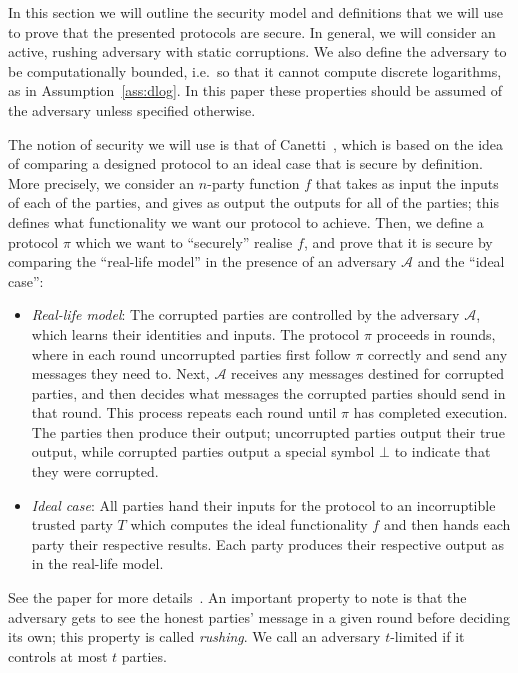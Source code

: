 \documentclass{article}
\newcommand\paper{paper}
\theoremstyle{remark}
\begin{document}
\newcommand{\ideal}[4]{\textup{\texttt{IDEAL}}_{#1, #2} (#3, #4)}
\newcommand{\idealD}{\ideal{\proto}{\mathcal{S}}{x}{z}}

In this section we will outline the security model and definitions that we will
use to prove that the presented protocols are secure. In general, we will
consider an active, rushing adversary with static corruptions. We also define
the adversary to be computationally bounded, i.e.\ so that it cannot compute
discrete logarithms, as in Assumption~\ref{ass:dlog}. In this \paper{} these
properties should be assumed of the adversary unless specified otherwise.

The notion of security we will use is that of Canetti~\cite{c00}, which is
based on the idea of comparing a designed protocol to an ideal case that is
secure by definition. More precisely, we consider an $n$-party function $f$
that takes as input the inputs of each of the parties, and gives as output the
outputs for all of the parties; this defines what functionality we want our
protocol to achieve. Then, we define a protocol $\pi$ which we want to
``securely'' realise $f$, and prove that it is secure by comparing the
``real-life model'' in the presence of an adversary $\mathcal{A}$ and the
``ideal case'':
\begin{itemize}
	\item \textit{Real-life model}: The corrupted parties are controlled by the
		adversary $\mathcal{A}$, which learns their identities and inputs. The
		protocol $\pi$ proceeds in rounds, where in each round uncorrupted
		parties first follow $\pi$ correctly and send any messages they need
		to. Next, $\mathcal{A}$ receives any messages destined for corrupted
		parties, and then decides what messages the corrupted parties should
		send in that round. This process repeats each round until $\pi$ has
		completed execution. The parties then produce their output; uncorrupted
		parties output their true output, while corrupted parties output a
		special symbol $\bot$ to indicate that they were corrupted.

	\item \textit{Ideal case}: All parties hand their inputs for the protocol
		to an incorruptible trusted party $T$ which computes the ideal
		functionality $f$ and then hands each party their respective results.
		Each party produces their respective output as in the real-life model.
\end{itemize}
See the paper for more details~\cite{c00}. An important property to note is
that the adversary gets to see the honest parties' message in a given round
before deciding its own; this property is called \textit{rushing}. We call an
adversary $t$-limited if it controls at most $t$ parties.
\end{document}
